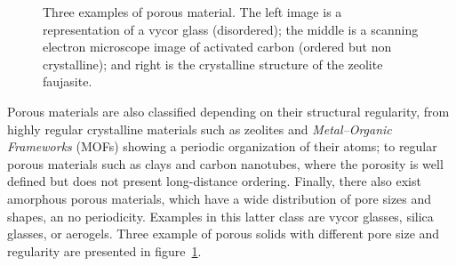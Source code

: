 \documentclass[thesis]{subfiles}
\begin{document}
\begin{figure}[ht]
    \centering
    \hfill
    \hfill
    \caption{Three examples of porous material. The left image is a
    representation of a vycor glass (disordered)\cite{Levitz2003}; the middle
    is a scanning electron microscope image of activated carbon (ordered but non
    crystalline)\cite{Das2015}; and right is the crystalline structure of the
    zeolite faujasite.}
    \label{fig:porous-examples}
\end{figure}

Porous materials are also classified depending on their structural regularity,
from highly regular crystalline materials such as zeolites and
\emph{Metal--Organic Frameworks} (MOFs) showing a periodic organization of their
atoms; to regular porous materials such as clays and carbon nanotubes, where the
porosity is well defined but does not present long-distance ordering. Finally,
there also exist amorphous porous materials, which have a wide distribution of
pore sizes and shapes, an no periodicity. Examples in this latter class are
vycor glasses, silica glasses, or aerogels. Three example of porous solids with
different pore size and regularity are presented in
figure~\ref{fig:porous-examples}.
\end{document}
